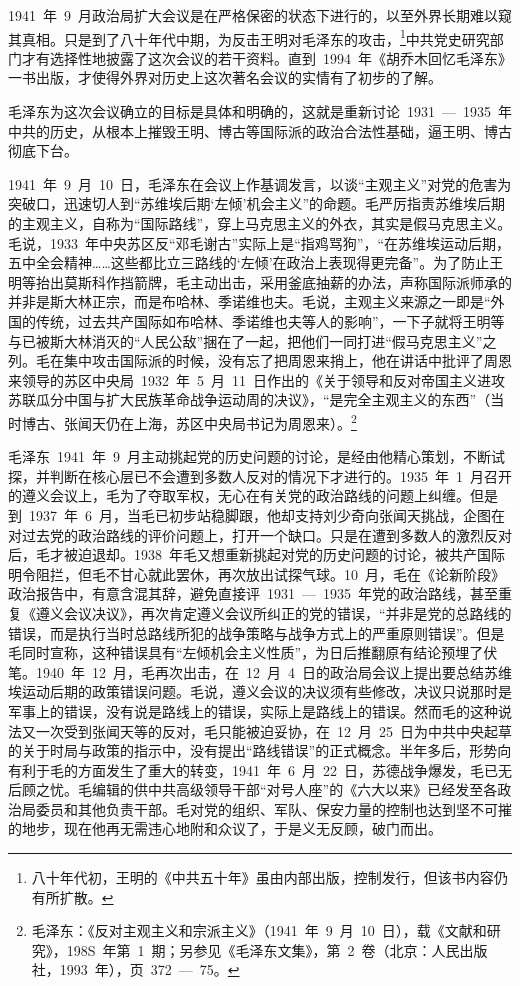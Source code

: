 1941~年~9~月政治局扩大会议是在严格保密的状态下进行的，以至外界长期难以窥其真相。只是到了八十年代中期，为反击王明对毛泽东的攻击，\footnote{八十年代初，王明的《中共五十年》虽由内部出版，控制发行，但该书内容仍有所扩散。}中共党史研究部门才有选择性地披露了这次会议的若干资料。直到~1994~年《胡乔木回忆毛泽东》一书出版，才使得外界对历史上这次著名会议的实情有了初步的了解。

毛泽东为这次会议确立的目标是具体和明确的，这就是重新讨论~1931~—~1935~年中共的历史，从根本上摧毁王明、博古等国际派的政治合法性基础，逼王明、博古彻底下台。

1941~年~9~月~10~日，毛泽东在会议上作基调发言，以谈“主观主义”对党的危害为突破口，迅速切人到“苏维埃后期‘左倾’机会主义”的命题。毛严厉指责苏维埃后期的主观主义，自称为“国际路线”，穿上马克思主义的外衣，其实是假马克思主义。毛说，1933~年中央苏区反“邓毛谢古”实际上是“指鸡骂狗”，“在苏维埃运动后期，五中全会精神……这些都比立三路线的‘左倾’在政治上表现得更完备”。为了防止王明等抬出莫斯科作挡箭牌，毛主动出击，采用釜底抽薪的办法，声称国际派师承的并非是斯大林正宗，而是布哈林、季诺维也夫。毛说，主观主义来源之一即是“外国的传统，过去共产国际如布哈林、季诺维也夫等人的影响”，一下子就将王明等与已被斯大林消灭的“人民公敌”捆在了一起，把他们一同打进“假马克思主义”之列。毛在集中攻击国际派的时候，没有忘了把周恩来捎上，他在讲话中批评了周恩来领导的苏区中央局~1932~年~5~月~11~日作出的《关于领导和反对帝国主义进攻苏联瓜分中国与扩大民族革命战争运动周的决议》，“是完全主观主义的东西”（当时博古、张闻天仍在上海，苏区中央局书记为周恩来）。\footnote{毛泽东：《反对主观主义和宗派主义》（1941~年~9~月~10~日），载《文献和研究》，198S~年第~1~期；另参见《毛泽东文集》，第~2~卷（北京：人民出版社，1993~年），页~372~—~75。}

毛泽东~1941~年~9~月主动挑起党的历史问题的讨论，是经由他精心策划，不断试探，并判断在核心层已不会遭到多数人反对的情况下才进行的。1935~年~1~月召开的遵义会议上，毛为了夺取军权，无心在有关党的政治路线的问题上纠缠。但是到~1937~年~6~月，当毛已初步站稳脚跟，他却支持刘少奇向张闻天挑战，企图在对过去党的政治路线的评价问题上，打开一个缺口。只是在遭到多数人的激烈反对后，毛才被迫退却。1938~年毛又想重新挑起对党的历史问题的讨论，被共产国际明令阻拦，但毛不甘心就此罢休，再次放出试探气球。10~月，毛在《论新阶段》政治报告中，有意含混其辞，避免直接评~1931~—~1935~年党的政治路线，甚至重复《遵义会议决议》，再次肯定遵义会议所纠正的党的错误，“并非是党的总路线的错误，而是执行当时总路线所犯的战争策略与战争方式上的严重原则错误”。但是毛同时宣称，这种错误具有“左倾机会主义性质”，为日后推翻原有结论预埋了伏笔。1940~年~12~月，毛再次出击，在~12~月~4~日的政治局会议上提出要总结苏维埃运动后期的政策错误问题。毛说，遵义会议的决议须有些修改，决议只说那时是军事上的错误，没有说是路线上的错误，实际上是路线上的错误。然而毛的这种说法又一次受到张闻天等的反对，毛只能被迫妥协，在~12~月~25~日为中共中央起草的关于时局与政策的指示中，没有提出“路线错误”的正式概念。半年多后，形势向有利于毛的方面发生了重大的转变，1941~年~6~月~22~日，苏德战争爆发，毛已无后顾之忧。毛编辑的供中共高级领导干部“对号人座”的《六大以来》已经发至各政治局委员和其他负责干部。毛对党的组织、军队、保安力量的控制也达到坚不可摧的地步，现在他再无需违心地附和众议了，于是义无反顾，破门而出。

